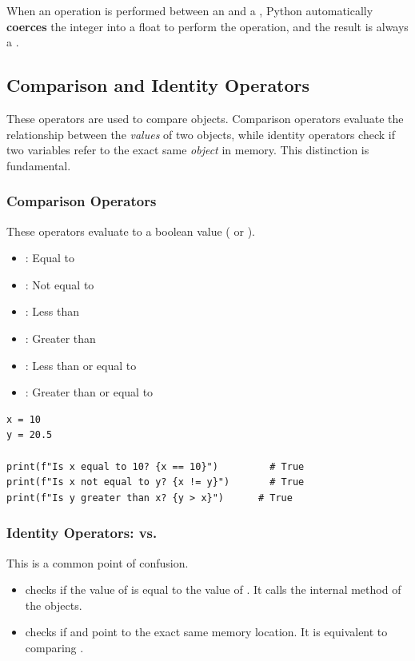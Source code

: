 When an operation is performed between an  and a , Python automatically \textbf{coerces} the integer into a float to perform the operation, and the result is always a .

\subsection{Comparison and Identity Operators}
\label{subsec:comparison_identity}
These operators are used to compare objects. Comparison operators evaluate the relationship between the \textit{values} of two objects, while identity operators check if two variables refer to the exact same \textit{object} in memory. This distinction is fundamental.

\subsubsection*{Comparison Operators}
These operators evaluate to a boolean value ( or ).
\begin{itemize}
    \item \code{==}: Equal to
    \item \code{!=}: Not equal to
    \item \code{<}: Less than
    \item \code{>}: Greater than
    \item \code{<=}: Less than or equal to
    \item \code{>=}: Greater than or equal to
\end{itemize}
\text{ }\begin{verbatim}
x = 10
y = 20.5

print(f"Is x equal to 10? {x == 10}")         # True
print(f"Is x not equal to y? {x != y}")       # True
print(f"Is y greater than x? {y > x}")      # True
\end{verbatim}

\subsubsection*{Identity Operators:  vs. \code{==}}
This is a common point of confusion.
\begin{itemize}
    \item {} checks if the value of  is equal to the value of . It calls the internal  method of the objects.
    \item {} checks if  and  point to the exact same memory location. It is equivalent to comparing .
\end{itemize}

